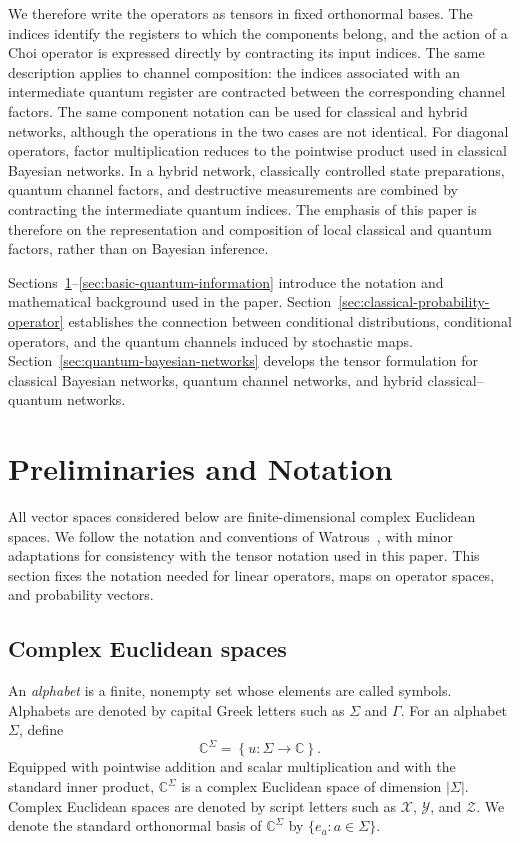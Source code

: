 \documentclass[
    aps,
    pra,
    reprint,
    superscriptaddress,
    nofootinbib
]{revtex4-2}
\theoremstyle{definition}
\theoremstyle{plain}
\begin{document}
We therefore write the operators as tensors in fixed orthonormal bases.
The indices identify the registers to which the components belong, and the
action of a Choi operator is expressed directly by contracting its input
indices. The same description applies to channel composition: the indices
associated with an intermediate quantum register are contracted between
the corresponding channel factors. 
The same component notation can be used for classical and hybrid networks,
although the operations in the two cases are not identical. For diagonal
operators, factor multiplication reduces to the pointwise product used in
classical Bayesian networks. In a hybrid network, classically controlled
state preparations, quantum channel factors, and destructive measurements
are combined by contracting the intermediate quantum indices. The emphasis
of this paper is therefore on the representation and composition of local
classical and quantum factors, rather than on Bayesian inference.

Sections~\ref{sec:preliminaries}--\ref{sec:basic-quantum-information}
introduce the notation and mathematical background used in the paper.
Section~\ref{sec:classical-probability-operator} establishes the connection
between conditional distributions, conditional operators, and the quantum
channels induced by stochastic maps.
Section~\ref{sec:quantum-bayesian-networks} develops the tensor formulation
for classical Bayesian networks, quantum channel networks, and hybrid
classical--quantum networks.

\section{Preliminaries and Notation}
\label{sec:preliminaries}

All vector spaces considered below are finite-dimensional complex Euclidean
spaces. We follow the notation and conventions of
Watrous~\cite[Secs.~1.1.1--1.1.2 and 1.2.1]{Watrous2018}, with minor
adaptations for consistency with the tensor notation used in this paper.
This section fixes the notation needed for linear operators, maps on
operator spaces, and probability vectors.

\subsection{Complex Euclidean spaces}

An \emph{alphabet} is a finite, nonempty set whose elements are called
symbols. Alphabets are denoted by capital Greek letters such as $\Sigma$ and
$\Gamma$. For an alphabet $\Sigma$, define
\begin{equation}
    \mathbb{C}^{\Sigma}
    =
    \left\{u:\Sigma\to\mathbb{C}\right\}.
\end{equation}
Equipped with pointwise addition and scalar multiplication and with the
standard inner product, $\mathbb{C}^{\Sigma}$ is a complex Euclidean space
of dimension $\lvert\Sigma\rvert$.
Complex Euclidean spaces are denoted by script letters such as
$\mathcal{X}$, $\mathcal{Y}$, and $\mathcal{Z}$. We denote the standard
orthonormal basis of $\mathbb{C}^{\Sigma}$ by
$\{e_a:a\in\Sigma\}$.
\end{document}
